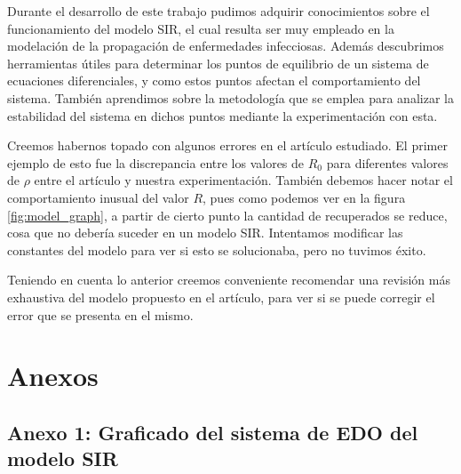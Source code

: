 \documentclass{article}
\begin{document}
Durante el desarrollo de este trabajo pudimos adquirir conocimientos sobre el funcionamiento del modelo SIR, el cual resulta ser muy empleado en la modelaci\'on de la propagación de enfermedades infecciosas. Adem\'as descubrimos herramientas \'utiles para determinar los puntos de equilibrio de un sistema de ecuaciones diferenciales, y como estos puntos afectan el comportamiento del sistema. Tambi\'en aprendimos sobre la  metodolog\'ia que se emplea para analizar la estabilidad del sistema en dichos puntos mediante la experimentaci\'on con esta. \par
Creemos habernos topado con algunos errores en el art\'iculo estudiado. El primer ejemplo de esto fue la discrepancia entre los valores de $R_0$ para diferentes valores de $\rho$ entre el art\'iculo y nuestra experimentaci\'on. Tambi\'en debemos hacer notar el comportamiento inusual del valor $R$, pues como podemos ver en la figura \ref{fig:model_graph}, a partir de cierto punto la cantidad de recuperados se reduce, cosa que no deber\'ia suceder en un modelo SIR. Intentamos modificar las constantes del modelo para ver si esto se solucionaba, pero no tuvimos \'exito. \par
Teniendo en cuenta lo anterior creemos conveniente recomendar una revisi\'on m\'as exhaustiva del modelo propuesto en el art\'iculo, para ver si se puede corregir el error que se presenta en el mismo. \par

\section{Anexos}

\subsection*{Anexo 1: Graficado del sistema de EDO del modelo SIR}
\end{document}
